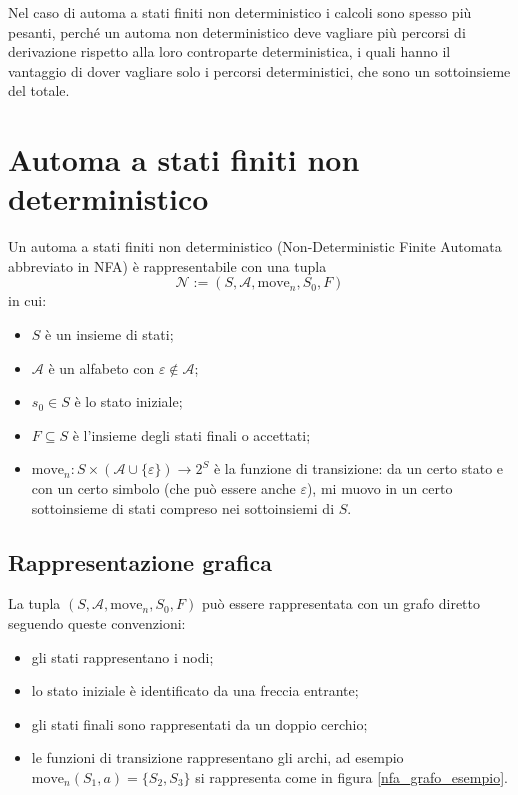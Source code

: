 \documentclass[class=book, crop=false, oneside, 12pt]{standalone}
\begin{document}
Nel caso di automa a stati finiti non deterministico i calcoli sono spesso più pesanti, perché un automa non deterministico deve vagliare più percorsi di derivazione rispetto alla loro controparte deterministica, i quali hanno il vantaggio di dover vagliare solo i percorsi deterministici, che sono un sottoinsieme del totale.

\section{Automa a stati finiti non deterministico}
Un automa a stati finiti non deterministico (Non-Deterministic Finite Automata abbreviato in NFA) è rappresentabile con una tupla
\begin{equation}
    \mathcal{N} := (S, \mathcal{A}, \textrm{move}_n, S_0, F)
    \label{nfa_tupla}
\end{equation}
in cui:
\begin{itemize}
    \item \(S\) è un insieme di stati;
    \item \(\mathcal{A}\) è un alfabeto con \(\varepsilon \notin \mathcal{A}\);
    \item \(s_0 \in S\) è lo stato iniziale;
    \item \(F \subseteq S\) è l’insieme degli stati finali o accettati;
    \item \(\textrm{move}_n : S \times (\mathcal{A} \cup \{\varepsilon\}) \to 2^S\) è la funzione di transizione: da un certo stato e con un certo simbolo (che può essere anche \(\varepsilon\)), mi muovo in un certo sottoinsieme di stati compreso nei sottoinsiemi di \(S\).
\end{itemize}

\subsection{Rappresentazione grafica}
La tupla \((S, \mathcal{A}, \textrm{move}_n, S_0, F)\) può essere rappresentata con un grafo diretto seguendo queste convenzioni:
\begin{itemize}
    \item gli stati rappresentano i nodi;
    \item lo stato iniziale è identificato da una freccia entrante;
    \item gli stati finali sono rappresentati da un doppio cerchio;
    \item le funzioni di transizione rappresentano gli archi, ad esempio \(\textrm{move}_n(S_1, a) = \{S_2, S_3\}\) si rappresenta come in figura \ref{nfa_grafo_esempio}.
\end{itemize}
\end{document}
